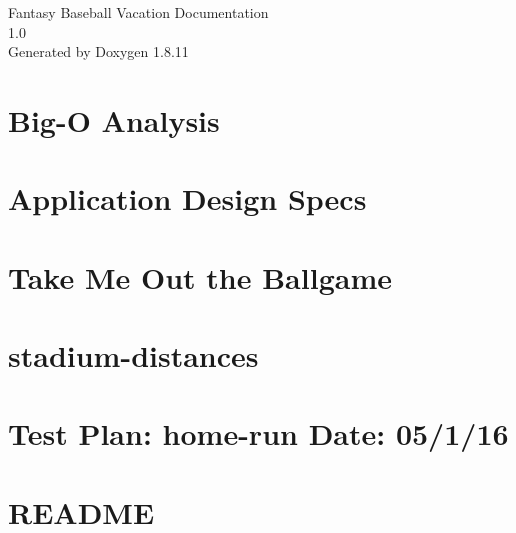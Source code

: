 \documentclass[twoside]{book}
\newcommand{\+}{\discretionary{\mbox{\scriptsize$\hookleftarrow$}}{}{}}
\newcommand{\clearemptydoublepage}{%
  \newpage{\pagestyle{empty}\cleardoublepage}%
}
\begin{document}
\hypersetup{pageanchor=false,
             bookmarksnumbered=true,
             pdfencoding=unicode
            }
\begin{titlepage}
\vspace*{7cm}
\begin{center}%
{\Large Fantasy Baseball Vacation Documentation \\[1ex]\large 1.\+0 }\\
\vspace*{1cm}
{\large Generated by Doxygen 1.8.11}\\
\end{center}
\end{titlepage}
\clearemptydoublepage
\tableofcontents
\clearemptydoublepage
{}
\hypersetup{pageanchor=true}

\chapter{Big-\/O Analysis}
\label{md_docs_Big-O-Analysis}
\hypertarget{md_docs_Big-O-Analysis}{}

\chapter{Application Design Specs}
\label{md_docs_design}
\hypertarget{md_docs_design}{}

\chapter{Take Me Out the Ballgame}
\label{md_docs_Project-Instructions}
\hypertarget{md_docs_Project-Instructions}{}

\chapter{stadium-\/distances}
\label{md_docs_stadium-distances}
\hypertarget{md_docs_stadium-distances}{}

\chapter{Test Plan\+: home-\/run Date\+: 05/1/16}
\label{md_docs_Test_Plan}
\hypertarget{md_docs_Test_Plan}{}

\chapter{R\+E\+A\+D\+ME}
\label{md_README}
\hypertarget{md_README}{}

\end{document}
